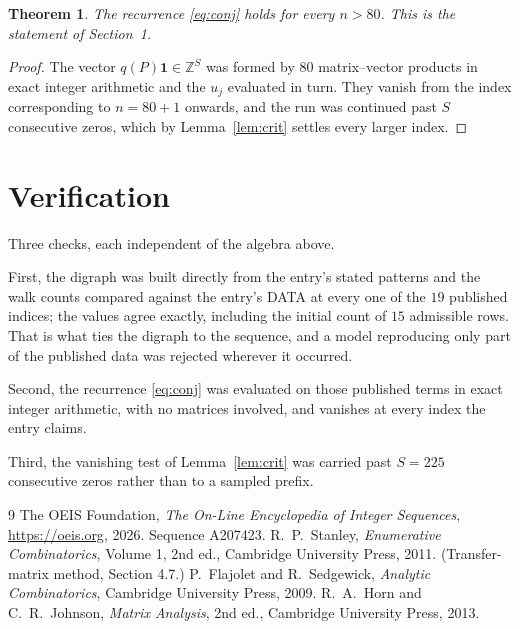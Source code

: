 \documentclass[11pt,a4paper]{article}
\theoremstyle{plain}
\newtheorem{theorem}{Theorem}
\theoremstyle{definition}
\begin{document}
\begin{theorem}
The recurrence \eqref{eq:conj} holds for every $n>80$. This is the statement of
Section~1.
\end{theorem}

\begin{proof}
The vector $q(P)\mathbf{1}\in\mathbb{Z}^{S}$ was formed by $80$ matrix--vector
products in exact integer arithmetic and the $u_j$ evaluated in turn. They vanish from the
index corresponding to $n=80+1$ onwards, and the run was continued past $S$ consecutive
zeros, which by Lemma~\ref{lem:crit} settles every larger index.
\end{proof}

\section{Verification}

Three checks, each independent of the algebra above.

First, the digraph was built directly from the entry's stated patterns and the walk counts
compared against the entry's DATA at every one of the $19$ published indices; the
values agree exactly, including the initial count of $15$ admissible rows. That is
what ties the digraph to the sequence, and a model reproducing only part of the published
data was rejected wherever it occurred.

Second, the recurrence \eqref{eq:conj} was evaluated on those published terms in exact
integer arithmetic, with no matrices involved, and vanishes at every index the entry claims.

Third, the vanishing test of Lemma~\ref{lem:crit} was carried past $S=225$ consecutive
zeros rather than to a sampled prefix.

\begin{thebibliography}{9}
 The OEIS Foundation, \emph{The On-Line Encyclopedia of Integer
Sequences}, \url{https://oeis.org}, 2026. Sequence A207423.
 R.~P.~Stanley, \emph{Enumerative Combinatorics}, Volume 1, 2nd ed.,
Cambridge University Press, 2011. (Transfer-matrix method, Section 4.7.)
 P.~Flajolet and R.~Sedgewick, \emph{Analytic Combinatorics}, Cambridge
University Press, 2009.
 R.~A.~Horn and C.~R.~Johnson, \emph{Matrix Analysis}, 2nd ed., Cambridge
University Press, 2013.
\end{thebibliography}
\end{document}
